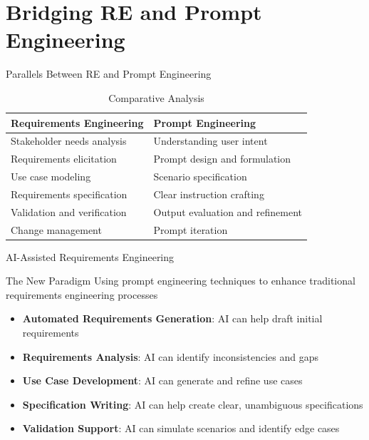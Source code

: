 \documentclass{beamer}
\begin{document}
\section{Bridging RE and Prompt Engineering}

\begin{frame}[t]{Parallels Between RE and Prompt Engineering}
    \begin{table}
        \centering
        \begin{tabular}{p{}|p{}}
            \textbf{Requirements Engineering} & \textbf{Prompt Engineering} \\
            \hline
            Stakeholder needs analysis & Understanding user intent \\
            Requirements elicitation & Prompt design and formulation \\
            Use case modeling & Scenario specification \\
            Requirements specification & Clear instruction crafting \\
            Validation and verification & Output evaluation and refinement \\
            Change management & Prompt iteration \\
        \end{tabular}
        \caption{Comparative Analysis}
    \end{table}
\end{frame}

\begin{frame}[t]{AI-Assisted Requirements Engineering}
    \begin{block}{The New Paradigm}
        Using prompt engineering techniques to enhance traditional requirements engineering processes
    \end{block}
    
    \begin{itemize}
        \item \textbf{Automated Requirements Generation}: AI can help draft initial requirements
        \item \textbf{Requirements Analysis}: AI can identify inconsistencies and gaps
        \item \textbf{Use Case Development}: AI can generate and refine use cases
        \item \textbf{Specification Writing}: AI can help create clear, unambiguous specifications
        \item \textbf{Validation Support}: AI can simulate scenarios and identify edge cases
    \end{itemize}
\end{frame}
\end{document}

